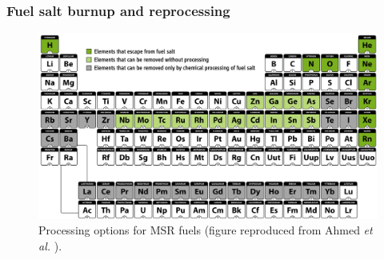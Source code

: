 \begin{frame}
\frametitle{Fuel salt burnup and reprocessing}
		\vspace{-5mm}
	\begin{figure}[t]
		\hspace*{-0.2in}
			\includegraphics[height=0.6\textwidth]{./images/periodic_map.png}
		\vspace{-0.15in}
		\caption{Processing options for MSR fuels (figure reproduced from Ahmed \emph{et al.}  \cite{ahmad_neutronics_2015}).}
	\end{figure}               
\end{frame}

